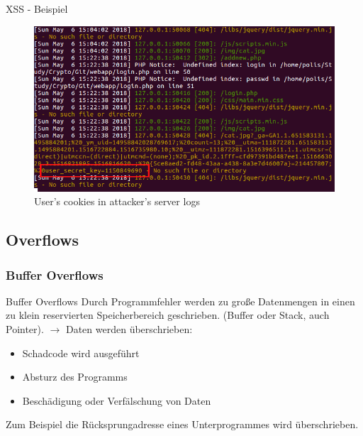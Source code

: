 \documentclass[10pt]{beamer}
\begin{document}
\begin{frame}[fragile]{XSS - Beispiel}
  \begin{figure}[ht]
      \centering
      \includegraphics[width=\textwidth]{XSS-3.png}
      \caption{User's cookies in attacker's server logs}
      \label{fig:figure3}
  \end{figure}
\end{frame}


\subsection{Overflows}

\subsubsection{Buffer Overflows}

\begin{frame}[fragile]{Buffer Overflows}
  Durch Programmfehler werden zu gro{\ss}e Datenmengen in einen zu klein reservierten Speicherbereich geschrieben.
  (Buffer oder Stack, auch Pointer).
  \newline
  \newline
  $\rightarrow$ Daten werden \"uberschrieben:
  \begin{itemize}
    \item Schadcode wird ausgef\"uhrt
    \item Absturz des Programms
    \item Besch\"adigung oder Verf\"alschung von Daten
  \end{itemize}
  Zum Beispiel die R\"ucksprungadresse eines Unterprogrammes wird \"uberschrieben.
\end{frame}
\end{document}
